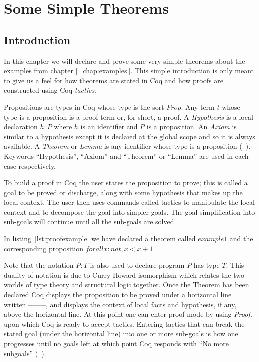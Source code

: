 \chapter{Some Simple Theorems}

\section{Introduction}

In this chapter we will declare and prove some very simple theorems about the examples from chapter [~\ref{chap:examples}]. This simple introduction is only meant to give us a feel for how theorems are stated in Coq and how proofs are constructed using Coq \emph{tactics}. 

Propositions are types in Coq whose type is the sort $Prop$. Any term $t$ whose type is a proposition is a proof term or, for short, a proof. A \emph{Hypothesis} is a local declaration $h : P$ where $h$ is an identifier and $P$ is a proposition. An \emph{Axiom} is similar to a hypothesis except it is declared at the global scope and so it is always available. A \emph{Theorem} or \emph{Lemma} is any identifier whose type is a proposition (~\cite{BC04}). Keywords ``Hypothesis'', ``Axiom'' and ``Theorem'' or ``Lemma'' are used in each case respectively. 

To build a proof in Coq the user states the proposition to prove; this is called a goal to be proved or discharge, along with some hypothesis that makes up the local context. The user then uses commands called tactics to manipulate the local context and to decompose the goal into simpler goals. The goal simplification into sub-goals will continue until all the sub-goals are solved.

In listing~\ref{lst:proofexample} we have declared a theorem called $example1$ and the corresponding proposition $forall x:nat, x < x + 1.$
 
Note that the notation $P : T$ is also used to declare program $P$ has type $T$. This duality of notation is due to Curry-Howard isomorphism which relates the two worlds of type theory and structural logic together. Once the Theorem has been declared Coq displays the proposition to be proved under a horizontal line written --------, and displays the context of local facts and hypothesis, if any, above the horizontal line. At this point one can enter proof mode by using \emph{Proof.} upon which Coq is ready to accept tactics. Entering tactics that can break the stated goal (under the horizontal line) into one or more sub-goals is how one progresses until no goals left at which point Coq responds with ``No more subgoals'' (~\cite{CoqHurry}).

